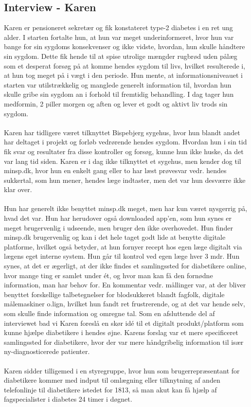 \subsection*{Interview - Karen}
Karen er pensioneret sekretær og fik konstateret type-2 diabetes i en ret ung alder. I starten fortalte hun, at hun var meget underinformeret, hvor hun var bange for sin sygdoms konsekvenser og ikke vidste, hvordan, hun skulle håndtere sin sygdom. Dette fik hende til at spise utrolige mængder rugbrød uden pålæg som et desperat forsøg på at komme hendes sygdom til livs, hvilket resulterede i, at hun tog meget på i vægt i den periode. Hun mente, at informationsniveauet i starten var utilstrækkelig og manglede generelt information til, hvordan hun skulle gribe sin sygdom an i forhold til fremtidig behandling. I dag tager hun medformin, 2 piller morgen og aften og lever et godt og aktivt liv trods sin sygdom.
\\ \\
Karen har tidligere været tilknyttet Bispebjerg sygehus, hvor hun blandt andet har deltaget i projekt og forløb vedrørende hendes sygdom. Hvordan hun i sin tid fik svar og resultater fra disse kontroller og forsøg, kunne hun ikke huske, da det var lang tid siden. Karen er i dag ikke tilknyttet et sygehus, men kender dog til minsp.dk, hvor hun en enkelt gang eller to har læst prøvesvar vedr. hendes sukkertal, som hun mener, hendes læge indtaster, men det var hun desværre ikke klar over. 
\\ \\
Hun har generelt ikke benyttet minsp.dk meget, men har kun været nysgerrig på, hvad det var. Hun har herudover også downloaded app'en, som hun synes er meget brugervenlig i udseende, men bruger den ikke overhovedet. Hun finder minsp.dk brugervenlig og kan i det hele taget godt lide at benytte digitale platforme, hvilket også betyder, at hun fornyer recept hos egen læge digitalt via lægens eget interne system. Hun går til kontrol ved egen læge hver 3 mdr. Hun synes, at det er ægerligt, at der ikke findes et samlingssted for diabetikere online, hvor mange ting er samlet under ét, og hvor man kan få den fornødne information, man har behov for. En kommentar vedr. mållinger var, at der bliver benyttet forskellige talbetegnelser for blodsukkeret blandt fagfolk, digitale målemaskiner o.lign, hvilket hun fandt ret frustrerende, og at det var hende selv, som skulle finde information og omregne tal. 
Som en afsluttende del af interviewet bad vi Karen foreslå en skør idé til et digitalt produkt/platform som kunne hjælpe diabetikere i hendes øjne. Karens forslag var et mere specificeret samlingssted for diabetikere, hvor der var mere håndgribelig information til især ny-diagnosticerede patienter.
\\ \\
Karen sidder tilligemed i en styregruppe, hvor hun som brugerrepræsentant for diabetikere kommer med indput til omlægning eller tilknytning af anden telefonlinje til diabetikere istedet for 1813, så man akut kan få hjælp af fagspecialister i diabetes 24 timer i døgnet.

